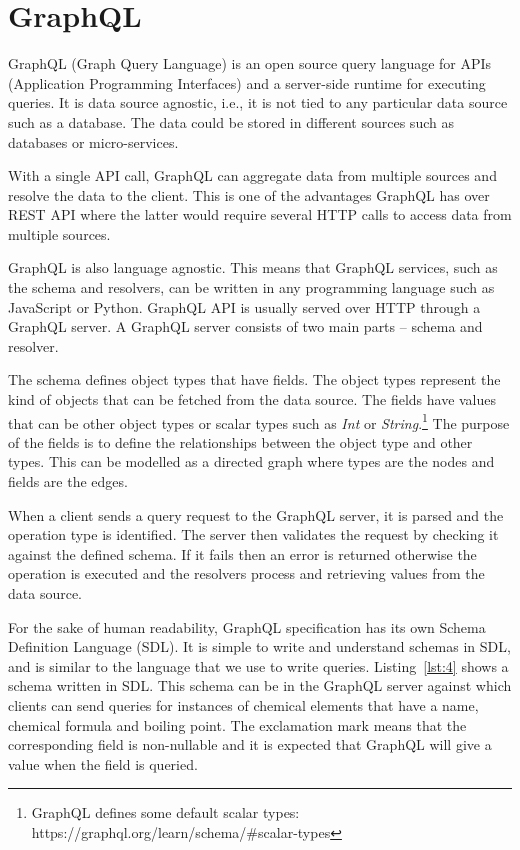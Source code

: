 \section{GraphQL}
\label{sec:graphql}
GraphQL (Graph Query Language) is an open source query language for APIs (Application Programming Interfaces) and a server-side runtime for executing queries. It is data source agnostic, i.e., it is not tied to any particular data source such as a database. The data could be stored in different sources such as databases or micro-services.

With a single API call, GraphQL can aggregate data from multiple sources and resolve the data to the client. This is one of the advantages GraphQL has over REST API where the latter would require several HTTP calls to access data from multiple sources. 

GraphQL is also language agnostic. This means that GraphQL services, such as the schema and resolvers, can be written in any programming language such as JavaScript or Python. GraphQL API is usually served over HTTP through a GraphQL server. A GraphQL server consists of two main parts – schema and resolver. 

The schema defines object types that have fields. The object types represent the kind of objects that can be fetched from the data source. The fields have values that can be other object types or scalar types such as \textit{Int} or \textit{String}.\footnote{GraphQL defines some default scalar types: https://graphql.org/learn/schema/\#scalar-types} The purpose of the fields is to define the relationships between the object type and other types. This can be modelled as a directed graph where types are the nodes and fields are the edges. 

When a client sends a query request to the GraphQL server, it is parsed and the operation type is identified. The server then validates the request by checking it against the defined schema. If it fails then an error is returned otherwise the operation is executed and the resolvers process and retrieving values from the data source.

For the sake of human readability, GraphQL specification has its own Schema Definition Language (SDL). It is simple to write and understand schemas in SDL, and is similar to the language that we use to write queries. Listing~\ref{lst:4} shows a schema written in SDL. This schema can be in the GraphQL server against which clients can send queries for instances of chemical elements that have a name, chemical formula and boiling point. The exclamation mark means that the corresponding field is non-nullable and it is expected that GraphQL will give a value when the field is queried.


